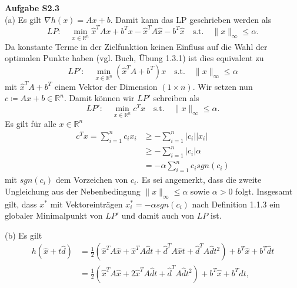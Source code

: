 \documentclass[ngerman, a4paper,12pt]{article}
\begin{document}

\par

\textbf{Aufgabe S2.3} \\

(a) Es gilt $\nabla h(x) = Ax + b$. Damit kann das LP geschrieben werden als
\begin{equation*}
	LP: \quad \min_{x \in \mathbb{R}^n} \hat{x}^T Ax + b^Tx - \hat{x}^TA \hat{x} - b^T \hat{x} \quad \text{s.t.} \quad \| x \|_{\infty} \leq \alpha.
\end{equation*}
Da konstante Terme in der Zielfunktion keinen Einfluss auf die Wahl der optimalen Punkte haben (vgl. Buch, Übung 1.3.1) ist dies equivalent zu
\begin{equation*}
	LP': \quad \min_{x \in \mathbb{R}^n} \left( \hat{x}^T A + b^T \right) x\quad \text{s.t.} \quad \| x \|_{\infty} \leq \alpha
\end{equation*}
mit $\hat{x}^T A + b^T$ einem Vektor der Dimension $(1\times n)$. Wir setzen nun $c \coloneqq A \hat{x} + b \in \mathbb{R}^n$. Damit können wir $LP'$ schreiben als
\begin{equation*}
LP': \quad \min_{x \in \mathbb{R}^n} c^T x\quad \text{s.t.} \quad \| x \|_{\infty} \leq \alpha.
\end{equation*}
Es gilt für alle $x \in \mathbb{R}^n$
\begin{equation*}
	\begin{split}
		c^Tx = \sum_{i=1}^{n} c_ix_i &\geq - \sum_{i=1}^{n} |c_i| |x_i| \\
		&\geq -\sum_{i=1}^{n} |c_i| \alpha \\
		&= -\alpha \sum_{i=1}^{n} c_i sgn(c_i) 
	\end{split}
\end{equation*}
mit $sgn(c_i)$ dem Vorzeichen von $c_i$. Es sei angemerkt, dass die zweite Ungleichung aus der Nebenbedingung $\| x \|_{\infty} \leq \alpha$ sowie $\alpha > 0$ folgt. Insgesamt gilt, dass $x^*$ mit Vektoreinträgen $x^*_i = - \alpha sgn(c_i)$ nach Definition 1.1.3 ein globaler Minimalpunkt von $LP'$ und damit auch von $LP$ ist.
\par
(b) Es gilt 
\begin{equation*}
	\begin{split}
		h(\hat{x} + t\hat{d}) &= \frac{1}{2} \left( \hat{x}^TA\hat{x} +\hat{x}^TA\hat{d}t + \hat{d}^TA\hat{x}t + \hat{d}^TA\hat{d}t^2 \right) + b^T\hat{x} + b^T\hat{d}t\\
		&= \frac{1}{2} \left( \hat{x}^TA\hat{x} +2 \hat{x}^TA\hat{d}t + \hat{d}^TA\hat{d}t^2 \right) + b^T\hat{x} + b^T\hat{d}t,
	\end{split}
\end{equation*}
\end{document}
